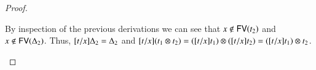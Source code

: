 \documentclass{elsarticle}
\begin{document}
\begin{proof}
\begin{report}
\begin{itemize}
\begin{center}
\end{center}
By inspection of the previous derivations we can see that $ \mathit{x}  \not\in \mathsf{FV}(  \mathit{t_{{\mathrm{2}}}}  ) $ and $ \mathit{x}  \not\in \mathsf{FV}(  \Delta_{{\mathrm{2}}}  ) $.  Thus, $[  \mathit{t}  /  \mathit{x}  ]  \Delta_{{\mathrm{2}}}  =  \Delta_{{\mathrm{2}}}$ and
$[  \mathit{t}  /  \mathit{x}  ]   (  \mathit{t_{{\mathrm{1}}}}  \otimes  \mathit{t_{{\mathrm{2}}}}  )   =    ( [  \mathit{t}  /  \mathit{x}  ]  \mathit{t_{{\mathrm{1}}}} )   \otimes   ( [  \mathit{t}  /  \mathit{x}  ]  \mathit{t_{{\mathrm{2}}}} )   =   ( [  \mathit{t}  /  \mathit{x}  ]  \mathit{t_{{\mathrm{1}}}} )   \otimes  \mathit{t_{{\mathrm{2}}}} $.


\end{itemize}
\end{report}
\end{proof}
\end{document}
